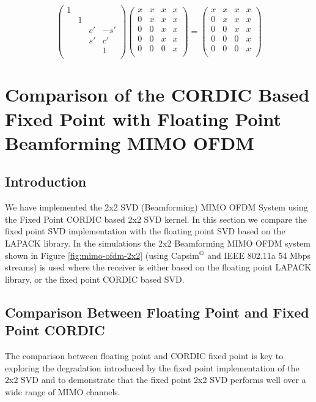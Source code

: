 \begin{equation}
\left(
  \begin{array}{cccc}
    1 &   &   &   \\
      & 1 &   &   \\
      &   & c' & -s' \\
      &   & s' & c' \\
      &   &   & 1 \\
  \end{array}
\right)
\left(
  \begin{array}{cccc}
    x & x & x & x \\
    0 & x & x & x \\
    0 & 0 & x & x \\
    0 & 0 & x & x \\
    0 & 0 & 0 & x \\
  \end{array}
\right)
=
\left(
  \begin{array}{cccc}
    x & x & x & x \\
    0 & x & x & x \\
    0 & 0 & x & x \\
    0 & 0 & 0 & x \\
    0 & 0 & 0 & x \\
  \end{array}
\right)
\end{equation}
\newpage



\chapter{Comparison of the CORDIC Based Fixed Point  with Floating Point Beamforming MIMO OFDM}

\section{Introduction}
We have implemented the 2x2 SVD (Beamforming) MIMO OFDM System using the Fixed Point CORDIC based 2x2 SVD kernel. In this section we compare the fixed point SVD implementation with the floating point SVD based on the LAPACK\cite{lapack}   library. In the simulations the 2x2 Beamforming MIMO OFDM system shown in Figure \ref{fig:mimo-ofdm-2x2} (using Capsim$\textsuperscript{\textregistered}$ and IEEE 802.11a 54 Mbps streams) is used where the receiver is either based on the floating point LAPACK library, or the fixed point CORDIC based SVD. 

\section{Comparison Between Floating Point and Fixed Point CORDIC  }
The comparison between floating point and CORDIC fixed point is key to exploring the degradation introduced by the fixed point implementation of the 2x2 SVD and to demonstrate that the fixed point 2x2 SVD performs well over a wide range of MIMO channels.
 
